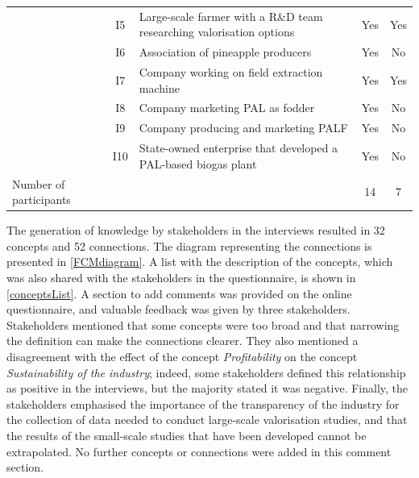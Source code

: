 \begin{table}[ht]
{\begin{threeparttable}
\begin{tabular}{lcp{}cc}
                           & I5  & Large-scale farmer with a R\&D team researching valorisation options                             &    Yes                   & Yes \\
                           & I6  & Association of pineapple producers                                                               &      Yes                 & No  \\
                           & I7  & Company working on field extraction machine                                                      &     Yes                  & Yes \\
                           & I8  & Company marketing PAL as fodder                                                                  &      Yes                 & No  \\
                           & I9  & Company producing and marketing PALF                                                             &     Yes                  & No  \\
                           & I10 & State-owned enterprise that developed a PAL-based biogas plant                                                               &  Yes                     & No  \\ \cline{1-5} 
Number of participants  & & &  14 & 7 \\ \hline \hline
\end{tabular}
\end{threeparttable}%
}
\end{table}


The generation of knowledge by stakeholders in the interviews resulted in 32 concepts and 52 connections. The diagram representing the connections is presented in \cref{FCMdiagram}. A list with the description of the concepts, which was also shared with the stakeholders in the questionnaire, is shown in \cref{conceptsList}. A section to add comments was provided on the online questionnaire, and valuable feedback was given by three stakeholders. Stakeholders mentioned that some concepts were too broad and that narrowing the definition can make the connections clearer. They also mentioned a disagreement with the effect of the concept \textit{Profitability} on the concept \textit{Sustainability of the industry}; indeed, some stakeholders defined this relationship as positive in the interviews, but the majority stated it was negative. Finally, the stakeholders emphasised the importance of the transparency of the industry for the collection of data needed to conduct large-scale valorisation studies, and that the results of the small-scale studies that have been developed cannot be extrapolated. No further concepts or connections were added in this comment section. 

